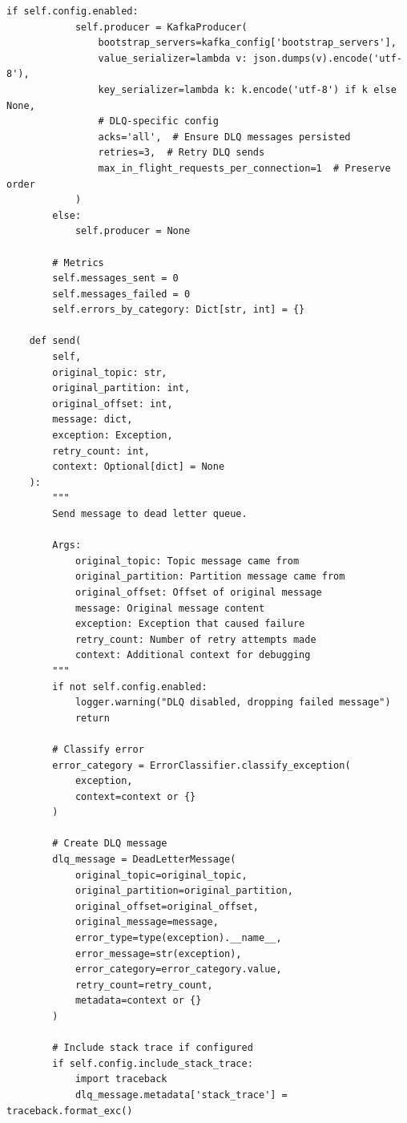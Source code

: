 \begin{lstlisting}[style=python, caption={Dead Letter Queue Implementation}]
        if self.config.enabled:
            self.producer = KafkaProducer(
                bootstrap_servers=kafka_config['bootstrap_servers'],
                value_serializer=lambda v: json.dumps(v).encode('utf-8'),
                key_serializer=lambda k: k.encode('utf-8') if k else None,
                # DLQ-specific config
                acks='all',  # Ensure DLQ messages persisted
                retries=3,  # Retry DLQ sends
                max_in_flight_requests_per_connection=1  # Preserve order
            )
        else:
            self.producer = None

        # Metrics
        self.messages_sent = 0
        self.messages_failed = 0
        self.errors_by_category: Dict[str, int] = {}

    def send(
        self,
        original_topic: str,
        original_partition: int,
        original_offset: int,
        message: dict,
        exception: Exception,
        retry_count: int,
        context: Optional[dict] = None
    ):
        """
        Send message to dead letter queue.

        Args:
            original_topic: Topic message came from
            original_partition: Partition message came from
            original_offset: Offset of original message
            message: Original message content
            exception: Exception that caused failure
            retry_count: Number of retry attempts made
            context: Additional context for debugging
        """
        if not self.config.enabled:
            logger.warning("DLQ disabled, dropping failed message")
            return

        # Classify error
        error_category = ErrorClassifier.classify_exception(
            exception,
            context=context or {}
        )

        # Create DLQ message
        dlq_message = DeadLetterMessage(
            original_topic=original_topic,
            original_partition=original_partition,
            original_offset=original_offset,
            original_message=message,
            error_type=type(exception).__name__,
            error_message=str(exception),
            error_category=error_category.value,
            retry_count=retry_count,
            metadata=context or {}
        )

        # Include stack trace if configured
        if self.config.include_stack_trace:
            import traceback
            dlq_message.metadata['stack_trace'] = traceback.format_exc()


\end{lstlisting}
